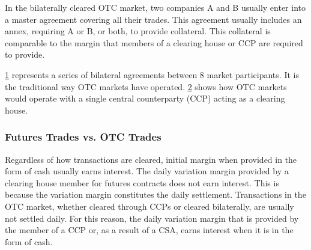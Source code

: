 In the bilaterally cleared OTC market, two companies A and B usually enter into a master agreement covering all their trades. This agreement usually includes an annex, requiring A or B, or both, to provide collateral. This collateral is comparable to the margin that members of a clearing house or CCP are required to provide.

\begin{figure}[h]
    \centering
    \begin{subfigure}{0.45\textwidth}
        \centering
        \caption{}
        \label{fig:a}
    \end{subfigure}
    \begin{subfigure}{0.45\textwidth}
        \centering            
        \caption{}
        \label{fig:b}
    \end{subfigure}
    \caption{}
	\label{fig:otc}
\end{figure}

\ref{fig:a} represents a series of bilateral agreements between 8 market participants. It is the traditional way OTC markets have operated. \ref{fig:b} shows how OTC markets would operate with a single central counterparty (CCP) acting as a clearing house.

\subsubsection*{Futures Trades vs. OTC Trades}

Regardless of how transactions are cleared, initial margin when provided in the form of cash usually earns interest. The daily variation margin provided by a clearing house member for futures contracts does not earn interest. This is because the variation margin constitutes the daily settlement. Transactions in the OTC market, whether cleared through CCPs or cleared bilaterally, are usually not settled daily. For this reason, the daily variation margin that is provided by the member of a CCP or, as a result of a CSA, earns interest when it is in the form of cash.

